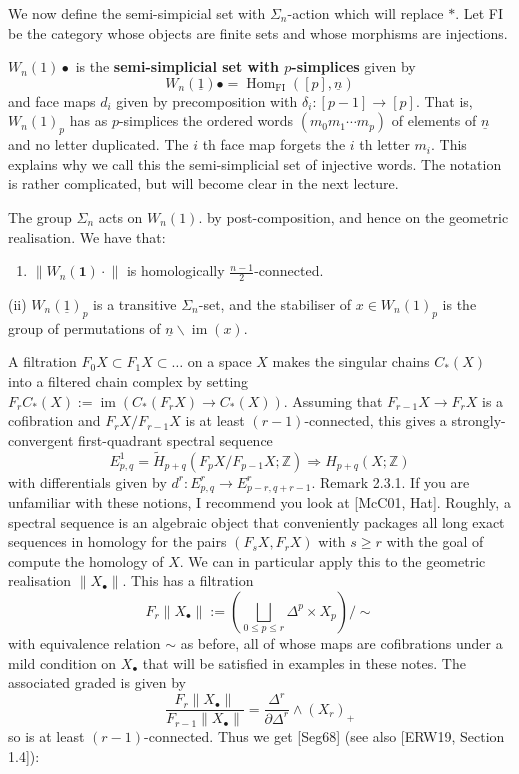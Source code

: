 We now define the semi-simpicial set with $\Sigma_n$-action which will replace $*$. Let FI be the category whose objects are finite sets and whose morphisms are injections.

$W_n(1) \bullet$ is the \textbf{semi-simplicial set with $p$-simplices} given by
$$
W_n(\underline{1}) \bullet=\operatorname{Hom}_{\mathrm{FI}}([p], \underline{n})
$$
and face maps $d_i$ given by precomposition with $\delta_i:[p-1] \rightarrow[p]$.
That is, $W_n(1)_p$ has as $p$-simplices the ordered words $\left(m_0 m_1 \cdots m_p\right)$ of elements of $\underline{n}$ and no letter duplicated. The $i$ th face map forgets the $i$ th letter $m_i$. This explains why we call this the semi-simplicial set of injective words. The notation is rather complicated, but will become clear in the next lecture.

The group $\Sigma_n$ acts on $W_n(1)$. by post-composition, and hence on the geometric realisation. We have that:

\begin{prop}
    \begin{enumerate}
        \item $\left\|W_n(\mathbf{1}) \cdot\right\|$ is homologically $\frac{n-1}{2}$-connected.
    \end{enumerate}
\end{prop}
(ii) $W_n(\underline{1})_p$ is a transitive $\Sigma_n$-set, and the stabiliser of $x \in W_n(1)_p$ is the group of permutations of $\underline{n} \backslash \operatorname{im}(x)$.


A filtration $F_0 X \subset F_1 X \subset \ldots$ on a space $X$ makes the singular chains $C_*(X)$ into a filtered chain complex by setting $F_r C_*(X):=\operatorname{im}\left(C_*\left(F_r X\right) \rightarrow C_*(X)\right)$. Assuming that $F_{r-1} X \rightarrow F_r X$ is a cofibration and $F_r X / F_{r-1} X$ is at least $(r-1)$-connected, this gives a strongly-convergent first-quadrant spectral sequence
$$
E_{p, q}^1=\widetilde{H}_{p+q}\left(F_p X / F_{p-1} X ; \mathbb{Z}\right) \Longrightarrow H_{p+q}(X ; \mathbb{Z})
$$
with differentials given by $d^r: E_{p, q}^r \rightarrow E_{p-r, q+r-1}^r$.
Remark 2.3.1. If you are unfamiliar with these notions, I recommend you look at [McC01, Hat]. Roughly, a spectral sequence is an algebraic object that conveniently packages all long exact sequences in homology for the pairs $\left(F_s X, F_r X\right)$ with $s \geq r$ with the goal of compute the homology of $X$.
We can in particular apply this to the geometric realisation $\left\|X_{\bullet}\right\|$. This has a filtration
$$
F_r\left\|X_{\bullet}\right\|:=\left(\bigsqcup_{0 \leq p \leq r} \Delta^p \times X_p\right) / \sim
$$
with equivalence relation $\sim$ as before, all of whose maps are cofibrations under a mild condition on $X_{\bullet}$ that will be satisfied in examples in these notes. The associated graded is given by
$$
\frac{F_r\left\|X_{\bullet}\right\|}{F_{r-1}\left\|X_{\bullet}\right\|}=\frac{\Delta^r}{\partial \Delta^r} \wedge\left(X_r\right)_{+}
$$
so is at least $(r-1)$-connected. Thus we get [Seg68] (see also [ERW19, Section 1.4]):

